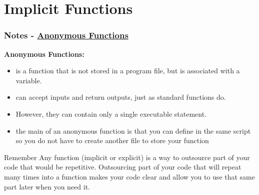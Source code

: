 \documentclass[11pt]{beamer}
\begin{document}
\section{Implicit Functions}
\begin{frame}[fragile]
	
	\frametitle{Notes - 
		\href{http://www.mathworks.com/help/matlab/matlab_prog/anonymous-functions.html}{Anonymous Functions}
	}

		\begin{exampleblock}{}
			\textbf{Anonymous Functions:}\\
			\begin{itemize}
				\item is a function that is not stored in a program file, but is associated with a variable.
				\item can accept inputs and return outputs, just as standard functions do. 
				\item However, they can contain only a single executable statement.
				
				\item the main of an anonymous function is that you can define in the same script so you do not have to create another file to store your function
			\end{itemize}
		\end{exampleblock}
	\begin{alertblock}{Remember}
		Any function (implicit or explicit) is a way to outsource part of your code that would be repetitive. Outsourcing part of your code that will repeat many times into a function makes your code clear and allow you to use that same part later when you need it. 
	\end{alertblock}
	\hspace{7pt}		
	
\end{frame}

\end{document}
